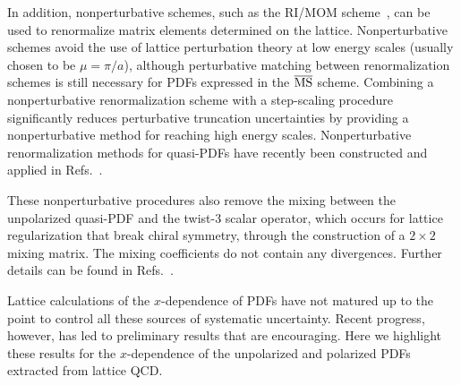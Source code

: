 \begin{itemize}
In addition, nonperturbative schemes, such as the 
RI/MOM scheme~\cite{Martinelli:1994ty}, 
can be used to renormalize matrix elements determined on the lattice. 
%
Nonperturbative schemes avoid the use of lattice perturbation theory at 
low energy scales (usually chosen to be $\mu = \pi/a$), although perturbative 
matching between renormalization schemes is still necessary for PDFs expressed 
in the $\overline{\rm MS}$ scheme. 
%
Combining a nonperturbative renormalization scheme with a step-scaling 
procedure~\cite{Luscher:1991wu} significantly reduces perturbative truncation 
uncertainties by providing a nonperturbative method for reaching high energy 
scales.
% 
Nonperturbative renormalization methods for quasi-PDFs have recently been 
constructed and applied in 
Refs.~\cite{Alexandrou:2017huk,Chen:2017mzz,Green:2017xeu}.

These nonperturbative procedures also remove the mixing between the unpolarized 
quasi-PDF and the twist-3 scalar operator, which occurs for lattice 
regularization that break chiral symmetry, through the construction 
of a $2\times2$ mixing matrix. 
%
The mixing coefficients do not contain any divergences. 
%
Further details can be found in Refs.~\cite{Alexandrou:2017huk,Chen:2017mzz}. 
\end{itemize}

Lattice calculations of the $x$-dependence of PDFs have not matured 
up to the point to control all these sources of systematic uncertainty.       
%
Recent progress, however, has led to preliminary results that are encouraging. 
%
Here we highlight these results for the $x$-dependence
of the unpolarized and polarized PDFs extracted from lattice QCD. 

